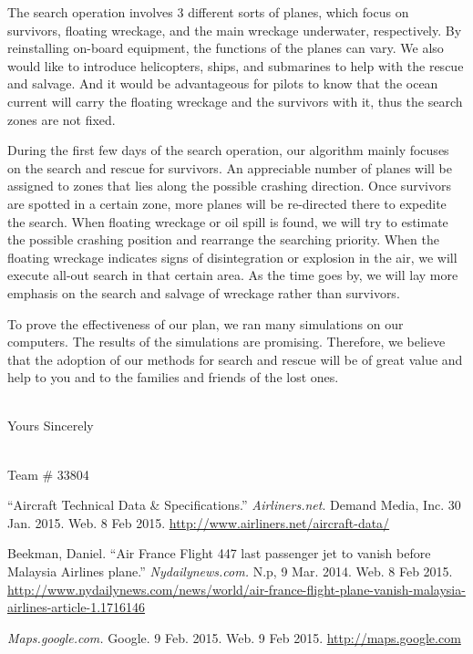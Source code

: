 \documentclass[a4paper,11pt]{article}
\begin{document}
\begin{spacing}{1.0}
The search operation involves 3 different sorts of planes, which focus on survivors, floating wreckage, and the main wreckage underwater, respectively. By reinstalling on-board equipment, the functions of the planes can vary. We also would like to introduce helicopters, ships, and submarines to help with the rescue and salvage. And it would be advantageous for pilots to know that the ocean current will carry the floating wreckage and the survivors with it, thus the search zones are not fixed.

During the first few days of the search operation, our algorithm mainly focuses on the search and rescue for survivors. An appreciable number of planes will be assigned to zones that lies along the possible crashing direction. Once survivors are spotted in a certain zone, more planes will be re-directed there to expedite the search. When floating wreckage or oil spill is found, we will try to estimate the possible crashing position and rearrange the searching priority. When the floating wreckage indicates signs of disintegration or explosion in the air, we will execute all-out search in that certain area. As the time goes by, we will lay more emphasis on the search and salvage of wreckage rather than survivors.

To prove the effectiveness of our plan, we ran many simulations on our computers. The results of the simulations are promising. Therefore, we believe that the adoption of our methods for search and rescue will be of great value and help to you and to the families and friends of the lost ones.
\\~

Yours Sincerely
\\~

Team \# 33804





\begin{thebibliography}{99}\label{References}
	 ``Aircraft Technical Data \& Specifications.'' \textit{Airliners.net}. Demand Media, Inc. 30 Jan. 2015. Web. 8 Feb 2015. \url{http://www.airliners.net/aircraft-data/}
	
	 Beekman, Daniel. ``Air France Flight 447 last passenger jet to vanish before Malaysia Airlines plane.'' {\it Nydailynews.com.} N.p, 9 Mar. 2014. Web. 8 Feb 2015. \url{http://www.nydailynews.com/news/world/air-france-flight-plane-vanish-malaysia-airlines-article-1.1716146}
	
	 {\it Maps.google.com.} Google. 9 Feb. 2015. Web. 9 Feb 2015. \url{http://maps.google.com}
	

\end{thebibliography}
\end{spacing}
\end{document}
